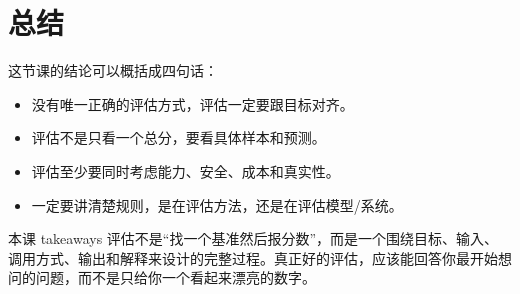 \section{总结}

这节课的结论可以概括成四句话：

\begin{itemize}
    \item 没有唯一正确的评估方式，评估一定要跟目标对齐。
    \item 评估不是只看一个总分，要看具体样本和预测。
    \item 评估至少要同时考虑能力、安全、成本和真实性。
    \item 一定要讲清楚规则，是在评估方法，还是在评估模型/系统。
\end{itemize}

\begin{knowledgebox}{本课 takeaways}
评估不是“找一个基准然后报分数”，而是一个围绕目标、输入、调用方式、输出和解释来设计的完整过程。真正好的评估，应该能回答你最开始想问的问题，而不是只给你一个看起来漂亮的数字。
\end{knowledgebox}


